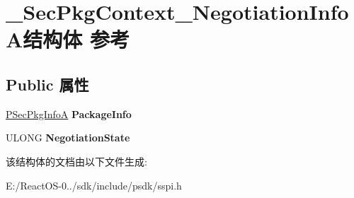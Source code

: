 \hypertarget{struct___sec_pkg_context___negotiation_info_a}{}\section{\+\_\+\+Sec\+Pkg\+Context\+\_\+\+Negotiation\+Info\+A结构体 参考}
\label{struct___sec_pkg_context___negotiation_info_a}
\subsection*{Public 属性}
\begin{DoxyCompactItemize}
\item 
\mbox{\label{struct___sec_pkg_context___negotiation_info_a_ab1f27d584ba62b74b7b5f91b34e47a6a}} 
\hyperlink{struct___sec_pkg_info_a}{P\+Sec\+Pkg\+InfoA} {\bfseries Package\+Info}
\item 
\mbox{\label{struct___sec_pkg_context___negotiation_info_a_ad06bae77d35bea66eb8a7a6b0f571f3e}} 
U\+L\+O\+NG {\bfseries Negotiation\+State}
\end{DoxyCompactItemize}


该结构体的文档由以下文件生成\+:\begin{DoxyCompactItemize}
\item 
E\+:/\+React\+O\+S-\/0../sdk/include/psdk/sspi.\+h\end{DoxyCompactItemize}
